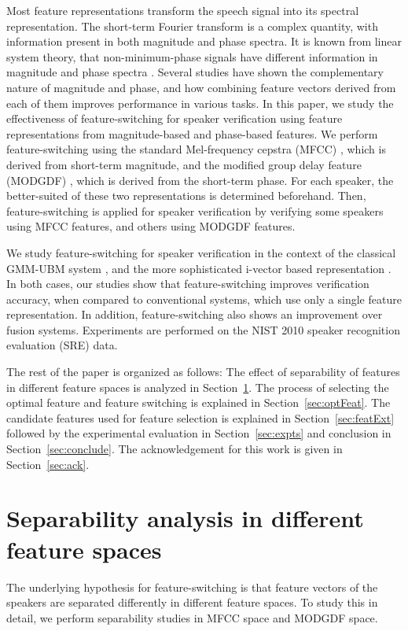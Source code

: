 \documentclass[preprint,12pt,5p]{elsarticle}
\begin{document}
Most feature representations transform the speech signal into its spectral
representation. The short-term Fourier transform is a complex quantity, with
information present in both magnitude and phase spectra. It is known from linear
system theory, that non-minimum-phase signals have different information in
magnitude and phase spectra \cite{oppenheim}. Several studies \cite{complement2}
have shown the complementary nature of magnitude and phase, and how combining feature
vectors derived from each of them improves performance in various tasks. In this
paper, we study the effectiveness of feature-switching for speaker verification
using feature representations from magnitude-based and phase-based features. We
perform feature-switching using the standard Mel-frequency cepstra (MFCC)
\cite{mfcc}, which is derived from short-term magnitude, and the modified group 
delay feature (MODGDF) \cite{hegdeModgdf}, which is derived from the short-term phase.
For each speaker, the better-suited of these two representations is determined
beforehand. Then, feature-switching is applied for speaker verification by verifying
some speakers using MFCC features, and others using MODGDF features.

We study feature-switching for speaker verification in the context of the
classical GMM-UBM system \cite{reynoldsAdaptedGMM}, and the more
sophisticated i-vector based representation \cite{dehak_ivector}. In both cases,
our studies show that feature-switching improves verification accuracy, when
compared to conventional systems, which use only a single feature
representation. In addition, feature-switching also shows an improvement over
fusion systems. Experiments are performed on the NIST 2010 speaker recognition
evaluation (SRE) \cite{nist2010SRE} data.

The rest of the paper is organized as follows: The effect of separability of features 
in different feature spaces is analyzed in Section~\ref{sec:separability}. The process 
of selecting the optimal feature and feature switching is explained in 
Section~\ref{sec:optFeat}. The candidate features used for 
feature selection is explained in Section~\ref{sec:featExt} followed by the experimental 
evaluation in Section~\ref{sec:expts} and conclusion in Section~\ref{sec:conclude}. The 
acknowledgement for this work is given in Section~\ref{sec:ack}.

\section{Separability analysis in different feature spaces}
\label{sec:separability}
The underlying hypothesis for feature-switching is that feature vectors of the 
speakers are separated differently in different feature spaces. To study this in detail, we
perform separability studies in MFCC space and MODGDF space.
\end{document}
